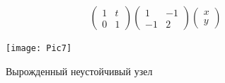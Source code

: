 \begin{figure}[!h]
\begin{minipage}[h]{0.49\linewidth}
\begin{gather*}
			\begin{pmatrix}
				1 & t\\
				0 & 1
			\end{pmatrix}
			\begin{pmatrix}
				1 & -1\\
				-1 & 2
			\end{pmatrix}
			\begin{pmatrix}
				x \\ y
			\end{pmatrix}
		\end{gather*}
	\end{minipage}
	\begin{minipage}[h]{0.49\linewidth}
		\texttt{[image: Pic7]}
		\caption{Вырожденный неустойчивый узел}
	\end{minipage}
\end{figure}